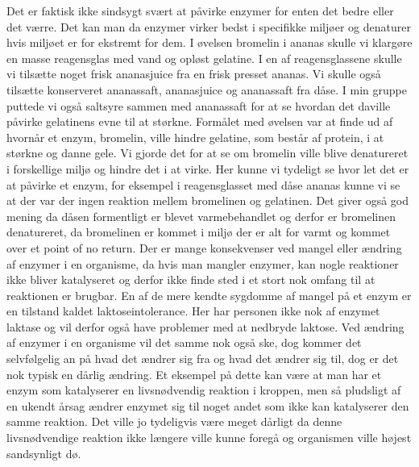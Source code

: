 Det er faktisk ikke sindsygt svært at påvirke enzymer for enten det bedre eller det værre. Det kan man da enzymer virker bedst i specifikke miljøer og denaturer hvis miljøet er for ekstremt for dem. I øvelsen bromelin i ananas skulle vi klargøre en masse reagensglas med vand og opløst gelatine. I en af reagensglassene skulle vi tilsætte noget frisk ananasjuice fra en frisk presset ananas. Vi skulle også tilsætte konserveret ananassaft, ananasjuice og ananassaft fra dåse. I min gruppe puttede vi også saltsyre sammen med ananassaft for at se hvordan det daville påvirke gelatinens evne til at størkne. Formålet med øvelsen var at finde ud af hvornår et enzym, bromelin, ville hindre gelatine, som består af protein, i at størkne og danne gele. Vi gjorde det for at se om bromelin ville blive denatureret i forskellige miljø og hindre det i at virke. Her kunne vi tydeligt se hvor let det er at påvirke et enzym, for eksempel i reagensglasset med dåse ananas kunne vi se at der var der ingen reaktion mellem bromelinen og gelatinen. Det giver også god mening da dåsen formentligt er blevet varmebehandlet og derfor er bromelinen denatureret, da bromelinen er kommet i miljø der er alt for varmt og kommet over et point of no return. 
Der er mange konsekvenser ved mangel eller ændring af enzymer i en organisme, da hvis man mangler enzymer, kan nogle reaktioner ikke bliver katalyseret og derfor ikke finde sted i et stort nok omfang til at reaktionen er brugbar. En af de mere kendte sygdomme af mangel på et enzym er en tilstand kaldet laktoseintolerance. Her har personen ikke nok af enzymet laktase og vil derfor også have problemer med at nedbryde laktose. Ved ændring af enzymer i en organisme vil det samme nok også ske, dog kommer det selvfølgelig an på hvad det ændrer sig fra og hvad det ændrer sig til, dog er det nok typisk en dårlig ændring. Et eksempel på dette kan være at man har et enzym som katalyserer en livsnødvendig reaktion i kroppen, men så pludsligt af en ukendt årsag ændrer enzymet sig til noget andet som ikke kan katalyserer den samme reaktion. Det ville jo tydeligvis være meget dårligt da denne livsnødvendige reaktion ikke længere ville kunne foregå og organismen ville højest sandsynligt dø. 

